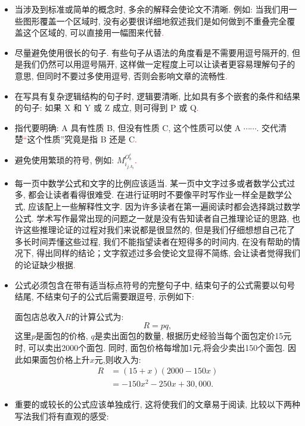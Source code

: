 \documentclass{formatBook}
\newcommand{\XG}[1]{\textcolor{red}{#1}}
\begin{document}
\begin{itemize}
    \item 当涉及到标准或简单的概念时, 多余的解释会使论文不清晰. 例如: 当我们用一些图形覆盖一个区域时, 没有必要很详细地叙述我们是如何做到不重叠完全覆盖这个区域的, 可以直接用一幅图来代替\XG{.}
    \item 尽量避免使用很长的句子. 有些句子从语法的角度看是不需要用逗号隔开的, 但是我们仍然可以用逗号隔开, 这样做一定程度上可以让读者更容易理解句子的意思, 但同时不要过多使用逗号, 否则会影响文章的流畅性\XG{.}
    \item 在写具有复杂逻辑结构的句子时, 逻辑要清晰, 比如具有多个嵌套的条件和结果的句子: 如果 X 和 Y 或 Z 成立, 则可得到 P 或 Q\XG{.}
    \item 指代要明确: A 具有性质 B, 但没有性质 C, 这个性质可以使 A $\cdots\cdots$. 交代清楚\XG{``}这个性质''究竟是指 B 还是 C\XG{.}
    \item 避免使用繁琐的符号, 例如: $M_{i_{j, k_{t}}}^{O_{b}^{c}}$\XG{.}
    \item 每一页中数学公式和文字的比例应该适当. 某一页中文字过多或者数学公式过多, 都会让读者看得很难受. 在进行证明时不要像平时写作业一样全是数学公式, 应该配上一些解释性文字. 因为许多读者在第一遍阅读时都会选择跳过数学公式. 学术写作最常出现的问题之一就是没有告知读者自己推理论证的思路, 也许这些推理论证的过程对我们来说都是很显然的, 但是我们仔细想想自己花了多长时间弄懂这些过程, 我们不能指望读者在短得多的时间内, 在没有帮助的情况下, 得出同样的结论；文字叙述过多会使论文显得不简练, 会让读者觉得我们的论证缺少根据\XG{.}
    \item 公式必须包含在带有适当标点符号的完整句子中, 结束句子的公式需要以句号结尾, 不结束句子的公式后需要跟逗号, 示例如下: \par
          面包店总收入$R$的计算公式为:
          \begin{equation*}
              R=pq,
          \end{equation*}
          这里$p$是面包的价格, $q$是卖出面包的数量, 根据历史经验当每个面包定价15元时, 可以卖出2000个面包. 同时, 面包价格每增加1元,将会少卖出150个面包. 因此如果面包价格上升$x$元,则收入为:
          \begin{equation*}
              \begin{split}
                  R&=(15+x)(2000-150x)\\
                  &=-150x^{2}-250x+30,000.
              \end{split}
          \end{equation*}
    \item 重要的或较长的公式应该单独成行, 这将使我们的文章易于阅读, 比较以下两种写法我们将有直观的感受:

\end{itemize}
\end{document}
